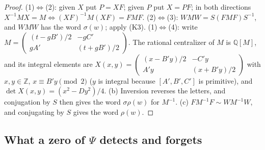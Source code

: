 \documentclass[11pt]{article}
\theoremstyle{definition}
\newcommand{\Z}{\mathbb Z}
\newcommand{\Q}{\mathbb Q}
\begin{document}
\begin{proof}
(1)$\Leftrightarrow$(2): given $X$ put $P=XF$; given $P$ put $X=PF$; in
both directions $X^{-1}MX=M\iff(XF)^{-1}M(XF)=FMF$.
(2)$\Leftrightarrow$(3): $WMW=S(FMF)S^{-1}$, and $WMW$ has the word
$\sigma(w)$; apply (K3).
(1)$\Leftrightarrow$(4): write $M=\begin{pmatrix}(t-gB')/2&-gC'\\gA'&(t+gB')/2\end{pmatrix}$.
The rational centralizer of $M$ is $\Q[M]$, and its integral elements are
$X(x,y)=\begin{pmatrix}(x-B'y)/2&-C'y\\A'y&(x+B'y)/2\end{pmatrix}$ with
$x,y\in\Z$, $x\equiv B'y\pmod2$ ($y$ is integral because $[A',B',C']$ is
primitive), and $\det X(x,y)=(x^2-Dy^2)/4$.
(b) Inversion reverses the letters, and conjugation by $S$ then gives the
word $\sigma\rho(w)$ for $M^{-1}$.
(c) $FM^{-1}F\sim WM^{-1}W$, and conjugating by $S$ gives the word $\rho(w)$.
\end{proof}

\subsection{What a zero of \texorpdfstring{$\Psi$}{Psi} detects and forgets}
\end{document}
